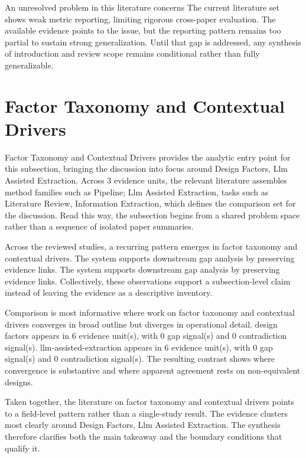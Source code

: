 \documentclass{article}
\begin{document}
An unresolved problem in this literature concerns The current literature set shows weak metric reporting, limiting rigorous cross-paper evaluation. The available evidence points to the issue, but the reporting pattern remains too partial to sustain strong generalization. Until that gap is addressed, any synthesis of introduction and review scope remains conditional rather than fully generalizable. \cite{02_2003_brosseau_trf,01_2001_hamed_safety_science}

\section{Factor Taxonomy and Contextual Drivers}
Factor Taxonomy and Contextual Drivers provides the analytic entry point for this subsection, bringing the discussion into focus around Design Factors, Llm Assisted Extraction. Across 3 evidence units, the relevant literature assembles method families such as Pipeline; Llm Assisted Extraction, tasks such as Literature Review, Information Extraction, which defines the comparison set for the discussion. Read this way, the subsection begins from a shared problem space rather than a sequence of isolated paper summaries. \cite{02_2003_brosseau_trf,01_2001_hamed_safety_science}

Across the reviewed studies, a recurring pattern emerges in factor taxonomy and contextual drivers. The system supports downstream gap analysis by preserving evidence links. The system supports downstream gap analysis by preserving evidence links. Collectively, these observations support a subsection-level claim instead of leaving the evidence as a descriptive inventory. \cite{02_2003_brosseau_trf,01_2001_hamed_safety_science,03_2006_yang_tra}

Comparison is most informative where work on factor taxonomy and contextual drivers converges in broad outline but diverges in operational detail. design factors appears in 6 evidence unit(s), with 0 gap signal(s) and 0 contradiction signal(s). llm-assisted-extraction appears in 6 evidence unit(s), with 0 gap signal(s) and 0 contradiction signal(s). The resulting contrast shows where convergence is substantive and where apparent agreement rests on non-equivalent designs. \cite{02_2003_brosseau_trf,01_2001_hamed_safety_science,03_2006_yang_tra}

Taken together, the literature on factor taxonomy and contextual drivers points to a field-level pattern rather than a single-study result. The evidence clusters most clearly around Design Factors, Llm Assisted Extraction. The synthesis therefore clarifies both the main takeaway and the boundary conditions that qualify it. \cite{02_2003_brosseau_trf,01_2001_hamed_safety_science}
\end{document}
